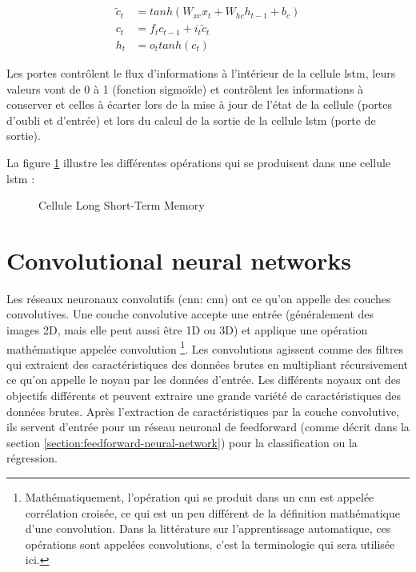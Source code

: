 \begin{align}
    \tilde{c}_t &= tanh(W_{xc}x_t+W_{hc}h_{t-1}+b_c) \label{equation:lstm_candidate_cell_state} \\
    c_t &= f_tc_{t-1}+i_t\tilde{c}_t \label{equation:lstm_cell_state}\\
    h_t &= o_ttanh(c_t) \label{equation:lstm_hidden_state}
\end{align}

Les portes contrôlent le flux d'informations à l'intérieur de la cellule \acrshort{lstm}, leurs valeurs vont de 0 à 1 (fonction sigmoïde) et contrôlent les informations à conserver et celles à écarter lors de la mise à jour de l'état de la cellule (portes d'oubli et d'entrée) et lors du calcul de la sortie de la cellule \acrshort{lstm} (porte de sortie).

La figure \ref{fig:lstm} illustre les différentes opérations qui se produisent dans une cellule \acrshort{lstm} :

\begin{figure}[h]
    \centering
    
    \caption{Cellule Long Short-Term Memory}
    \label{fig:lstm}
\end{figure}

\section{Convolutional neural networks}
\label{section:cnn}
Les réseaux neuronaux convolutifs (\acrlong{cnn}: \acrshort{cnn}) ont ce qu'on appelle des couches convolutives. Une couche convolutive accepte une entrée (généralement des images 2D, mais elle peut aussi être 1D ou 3D) et applique une opération mathématique appelée convolution \footnote{Mathématiquement, l'opération qui se produit dans un \acrshort{cnn} est appelée corrélation croisée, ce qui est un peu différent de la définition mathématique d'une convolution. Dans la littérature sur l'apprentissage automatique, ces opérations sont appelées convolutions, c'est la terminologie qui sera utilisée ici.}. Les convolutions agissent comme des filtres qui extraient des caractéristiques des données brutes en multipliant récursivement ce qu'on appelle le noyau par les données d'entrée.
Les différents noyaux ont des objectifs différents et peuvent extraire une grande variété de caractéristiques des données brutes. Après l'extraction de caractéristiques par la couche convolutive, ils servent d'entrée pour un réseau neuronal de feedforward (comme décrit dans la section \ref{section:feedforward-neural-network}) pour la classification ou la régression.



